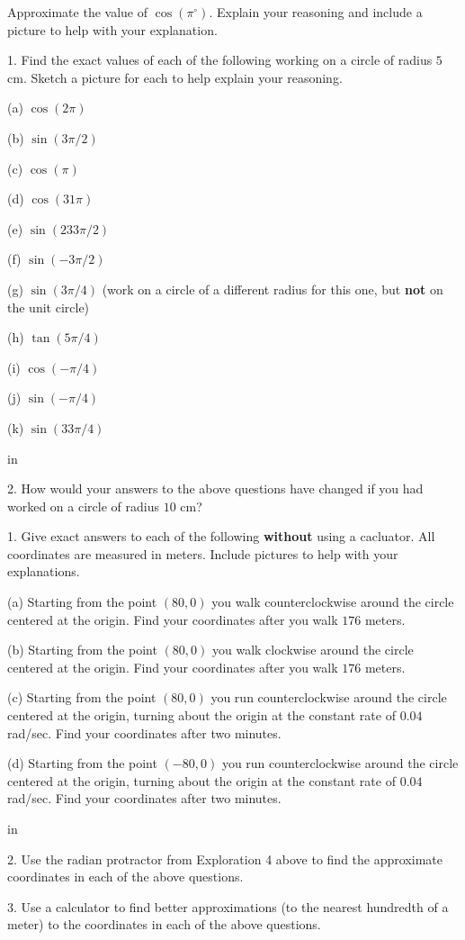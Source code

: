 \documentclass{ximera}
\newcommand{\pskip}{\vskip 0.1 in}
\begin{document}
\begin{question} \label{Q2:Cosine}
Approximate the value of $\cos (\pi^\circ)$. Explain your reasoning and include a picture to help with your explanation.
\end{question}


\begin{question}  \label{Q346fr:Cosine}
1. Find the exact values of each of the following working on a circle of radius $5$cm. Sketch a picture for each to help explain your reasoning. 

(a) $\cos (2\pi)$

(b) $\sin(3\pi/2)$

(c) $\cos(\pi)$

(d) $\cos(31\pi)$

(e) $\sin (233\pi/2)$

(f) $\sin(-3\pi/2)$

(g) $\sin(3\pi/4)$   (work on a circle of a different radius for this one, but {\bf not} on the unit circle)

(h) $\tan(5\pi/4)$

(i) $\cos(-\pi/4)$

(j) $\sin(-\pi/4)$

(k) $\sin(33\pi/4)$

\pskip

2. How would your answers to the above questions have changed if you had worked on a circle of radius $10$ cm?

\end{question}


\begin{question}  \label{Q2354234:Cosine}
1. Give exact answers to each of the following {\bf without} using a cacluator. All coordinates are measured in meters. Include pictures to help with your explanations.

(a) Starting from the point $(80,0)$ you walk counterclockwise around the circle centered at the origin. Find your coordinates after you walk $176$ meters.

(b) Starting from the point $(80,0)$ you walk clockwise around the circle centered at the origin. Find your coordinates after you walk $176$ meters.

(c)  Starting from the point $(80,0)$ you run counterclockwise around the circle centered at the origin, turning about the origin at the constant rate of $0.04$ rad/sec. Find your coordinates after two minutes.

(d) Starting from the point $(-80,0)$ you run counterclockwise around the circle centered at the origin, turning about the origin at the constant rate of $0.04$ rad/sec. Find your coordinates after two minutes.

\pskip

2. Use the radian protractor from Exploration 4 above to find the approximate coordinates in each of the above questions.

3. Use a calculator to find better approximations (to the nearest hundredth of a meter) to the coordinates in each of the above questions.


\end{question}
\end{document}
